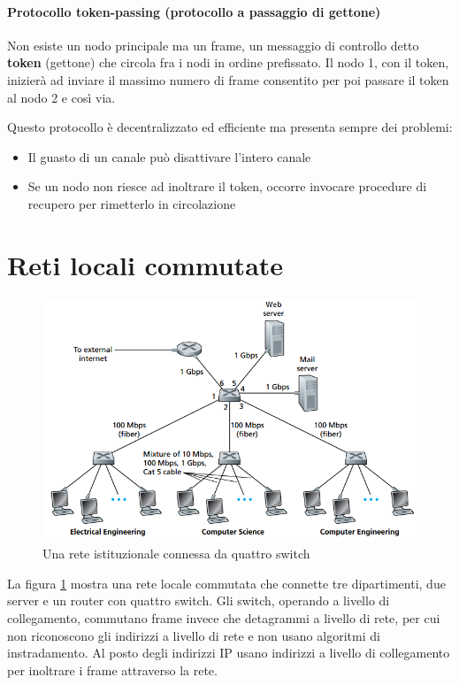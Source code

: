 \documentclass[11pt,a4paper]{book}
\begin{document}
\paragraph{Protocollo token-passing (protocollo a passaggio di gettone)}
Non esiste un nodo principale ma un frame, un messaggio di controllo detto \textbf{token} (gettone) che circola fra i nodi in ordine prefissato. Il nodo 1, con il token, inizierà ad inviare il massimo numero di frame consentito per poi passare il token al nodo 2 e così via.

Questo protocollo è decentralizzato ed efficiente ma presenta sempre dei problemi:
\begin{itemize}
	\item Il guasto di un canale può disattivare l'intero canale
	\item Se un nodo non riesce ad inoltrare il token, occorre invocare procedure di recupero per rimetterlo in circolazione
\end{itemize} 

\section{Reti locali commutate}
\begin{figure}
	\includegraphics[scale=0.55]{img/082.png}
	\caption{Una rete istituzionale connessa da quattro switch}
	\label{fig: 082}
\end{figure}
La figura \ref{fig: 082} mostra una rete locale commutata che connette tre dipartimenti, due server e un router con quattro switch. Gli switch, operando a livello di collegamento, commutano frame invece che detagrammi a livello di rete, per cui non riconoscono gli indirizzi a livello di rete e non usano algoritmi di instradamento. Al posto degli indirizzi IP usano indirizzi a livello di collegamento per inoltrare i frame attraverso la rete.
\end{document}
